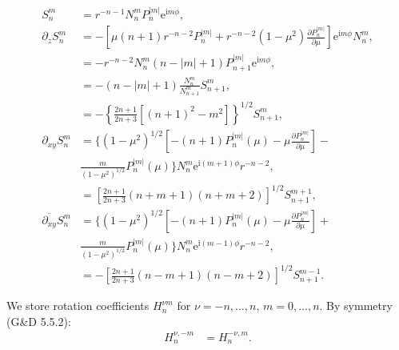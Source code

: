 \documentclass[a4paper,12pt]{article}
\newcommand{\E}{\mathrm{e}}
\newcommand{\J}{\mathrm{i}}
\begin{document}
\begin{align}
  S_{n}^{m} &= r^{-n-1}N_{n}^{m}P_{n}^{|m|}\E^{\J m\phi},\\
  \partial_{z} S_{n}^{m}
  &=
  -\left[
    \mu (n+1) r^{-n-2}P_{n}^{|m|} + r^{-n-2}(1-\mu^{2})
    \frac{\partial P_{n}^{|m|}}{\partial \mu}
  \right]\E^{\J m \phi} N_{n}^{m},\\
  &= -r^{-n-2}N_{n}^{m}(n-|m|+1)P_{n+1}^{|m|}\E^{\J m \phi},\\
  &= -(n-|m|+1)\frac{N_{n}^{m}}{N_{n+1}^{m}}S_{n+1}^{m},\\
  &=
  -\left\{
    \frac{2n+1}{2n+3}
    \left[(n+1)^{2}-m^{2}\right]
  \right\}^{1/2}S_{n+1}^{m},\\
  \partial_{xy}S_{n}^{m}
  &= 
  \biggl\{
  \left(1-\mu^{2}\right)^{1/2}
  \left[
    -(n+1)P_{n}^{|m|}(\mu)
    -\mu\frac{\partial P_{n}^{|m|}}{\partial \mu}
  \right]-\nonumber\\
  &\frac{m}{\left(1-\mu^{2}\right)^{1/2}}
  P_{n}^{|m|}(\mu)
  \biggr\}N_{n}^{m}\E^{\J(m+1)\phi}r^{-n-2},\\
  &= \left[
    \frac{2n+1}{2n+3}(n+m+1)(n+m+2)
  \right]^{1/2}S_{n+1}^{m+1},\\
  \overline{\partial_{xy}}S_{n}^{m}
  &= 
  \biggl\{
  \left(1-\mu^{2}\right)^{1/2}
  \left[
    -(n+1)P_{n}^{|m|}(\mu)
    -\mu\frac{\partial P_{n}^{|m|}}{\partial \mu}
  \right]+\nonumber\\
  &\frac{m}{\left(1-\mu^{2}\right)^{1/2}}
  P_{n}^{|m|}(\mu)
  \biggr\}N_{n}^{m}\E^{\J(m-1)\phi}r^{-n-2},\\
  &= -\left[
    \frac{2n+1}{2n+3}(n-m+1)(n-m+2)
  \right]^{1/2}S_{n+1}^{m-1}.
\end{align}

We store rotation coefficients $H_{n}^{\nu m}$ for $\nu=-n,\ldots,n$,
$m=0,\ldots,n$. By symmetry (G\&D 5.5.2):
\begin{align*}
  H_{n}^{\nu, -m} &= H_{n}^{-\nu, m}.
\end{align*}

\nocite{gumerov-duraiswami03}


\end{document}
